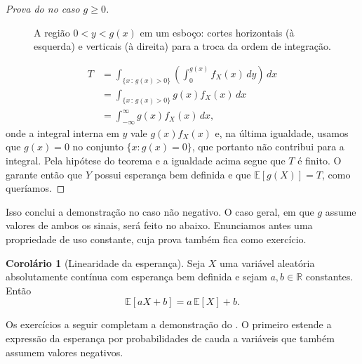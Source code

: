 \documentclass[12pt,portuguese]{article}
\theoremstyle{definition}
\newtheorem{corollary}[corollary]{Corolário}
\theoremstyle{plainexercise}
\theoremstyle{starredexercise}
\theoremstyle{definition}
\begin{document}
\begin{proof}[Prova do  no caso $g \geqslant 0$]
\begin{figure}[H]
\caption{A região $0<y<g(x)$ em um esboço: cortes horizontais
(à esquerda) e verticais (à direita) para a troca da ordem de integração.}
\label{fig:regiao-lotus-troca-ordem}
\end{figure}
\begin{align*}
T
&= \int_{\{x \,:\, g(x) > 0\}} \left(\int_{0}^{g(x)} f_X(x)\, dy\right) \,dx
\\[0.3cm]
&= \int_{\{x \,:\, g(x) > 0\}} g(x) f_X(x)\,dx
\\[0.3cm]
&= \int_{-\infty}^{\infty} g(x) f_X(x)\,dx,
\end{align*}
onde a integral interna em $y$ vale $g(x)f_X(x)$ e, na última igualdade,
usamos que $g(x) = 0$ no conjunto $\{x : g(x) = 0\}$, que portanto não
contribui para a integral. Pela hipótese do teorema e a igualdade
acima segue que $T$ é finito.
O  garante então que $Y$ possui esperança
bem definida e que $\mathbb{E}[g(X)]=T$, como queríamos.
\end{proof}

Isso conclui a demonstração no caso não negativo. O caso geral, em que
$g$ assume valores de ambos os sinais, será feito no
 abaixo. Enunciamos antes uma
propriedade de uso constante, cuja prova também fica como exercício.

\begin{corollary}[Linearidade da esperança]\label{cor:linearidade-esperanca}
  Seja $X$ uma variável aleatória absolutamente contínua com esperança bem definida e
  sejam $a, b \in \mathbb{R}$ constantes. Então
  \[
    \mathbb{E}[aX + b] = a\,\mathbb{E}[X] + b.
  \]
\end{corollary}

Os exercícios a seguir completam a demonstração do
. O primeiro estende a expressão da esperança
por probabilidades de cauda a variáveis que também assumem valores negativos.
\end{document}
